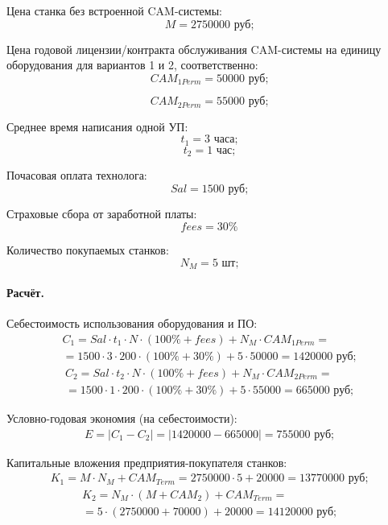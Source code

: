 Цена станка без встроенной CAM-системы:
\[M=2750000 \text{ руб;}\]

Цена годовой лицензии/контракта обслуживания CAM-системы на единицу оборудования для вариантов 1 и 2, соответственно:
\[{CAM}_{1Perm}=50000 \text{ руб;}\]

\[{CAM}_{2Perm}=55000 \text{ руб;}\]

Среднее время написания одной УП:
\[t_1=3 \text{ часа;}\]
\[t_2=1 \text{ час;}\]

Почасовая оплата технолога:
\[Sal=1500 \text{ руб;}\]

Страховые сбора от заработной платы:
\[fees=30\%\]

Количество покупаемых станков:
\[N_M=5 \text{ шт;}\]

\paragraph{Расчёт.}\label{par:ecocalc}

Себестоимость использования оборудования и ПО:
\begin{equation}
	\begin{aligned}
		C_1 = Sal \cdot t_1\cdot N \cdot(100\%+fees)+N_M \cdot CAM_{1Perm} =\\= 1500 \cdot 3 \cdot 200 \cdot (100\%+30\%)+5 \cdot 50000=1 420 000 \text{ руб;}
	\end{aligned}
\end{equation}
\begin{equation}
	\begin{aligned}
		C_2 = Sal \cdot t_2\cdot N \cdot(100\%+fees)+N_M \cdot CAM_{2Perm} =\\= 1500 \cdot 1 \cdot 200 \cdot (100\%+30\%)+5 \cdot 55000=665 000 \text{ руб;}
	\end{aligned}
\end{equation}

Условно-годовая экономия (на себестоимости):
\begin{equation}
	\begin{aligned}
		E=|C_1-C_2|=|1420000-665000|=755 000 \text{ руб;}
	\end{aligned}
\end{equation}

Капитальные вложения предприятия-покупателя станков:
\begin{equation}
	\begin{aligned}
		K_1=M \cdot N_M+{CAM}_{Term}=2750000 \cdot 5+20000=13 770 000 \text{ руб;}
	\end{aligned}
\end{equation}
\begin{equation}
	\begin{aligned}
		K_2=N_M \cdot (M+{CAM}_2)+{CAM}_{Term}=\\=5 \cdot (2750000+70000)+20000 = 14 120 000 \text{ руб;}
	\end{aligned}
\end{equation}

